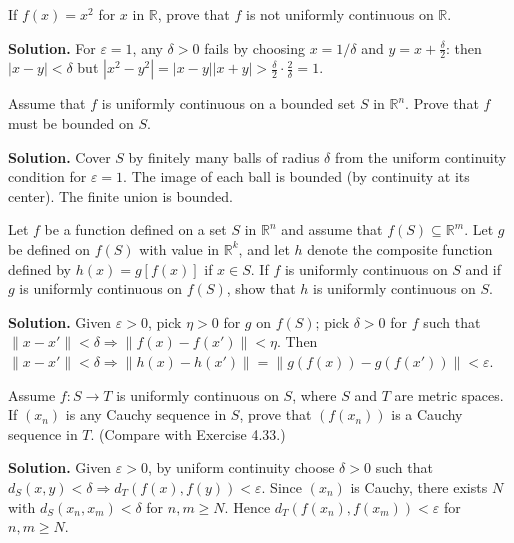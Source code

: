 \begin{problembox}
If $f(x) = x^2$ for $x$ in $\mathbb{R}$, prove that $f$ is not uniformly continuous on $\mathbb{R}$.
\end{problembox}

\noindent\textbf{Solution.}
For $\varepsilon=1$, any $\delta>0$ fails by choosing $x=1/\delta$ and $y=x+\tfrac{\delta}{2}$: then $|x-y|<\delta$ but $|x^2-y^2|=|x-y||x+y|>\tfrac{\delta}{2}\cdot\tfrac{2}{\delta}=1$.
\medskip

\begin{problembox}
Assume that $f$ is uniformly continuous on a bounded set $S$ in $\mathbb{R}^n$. Prove that $f$ must be bounded on $S$.
\end{problembox}

\noindent\textbf{Solution.}
Cover $S$ by finitely many balls of radius $\delta$ from the uniform continuity condition for $\varepsilon=1$. The image of each ball is bounded (by continuity at its center). The finite union is bounded.
\medskip

\begin{problembox}
Let $f$ be a function defined on a set $S$ in $\mathbb{R}^n$ and assume that $f(S) \subseteq \mathbb{R}^m$. Let $g$ be defined on $f(S)$ with value in $\mathbb{R}^k$, and let $h$ denote the composite function defined by $h(x) = g[f(x)]$ if $x \in S$. If $f$ is uniformly continuous on $S$ and if $g$ is uniformly continuous on $f(S)$, show that $h$ is uniformly continuous on $S$.
\end{problembox}

\noindent\textbf{Solution.}
Given $\varepsilon>0$, pick $\eta>0$ for $g$ on $f(S)$; pick $\delta>0$ for $f$ such that $\|x-x'\|<\delta\Rightarrow \|f(x)-f(x')\|<\eta$. Then $\|x-x'\|<\delta\Rightarrow \|h(x)-h(x')\|=\|g(f(x))-g(f(x'))\|<\varepsilon$.
\medskip

\begin{problembox}
Assume $f : S \to T$ is uniformly continuous on $S$, where $S$ and $T$ are metric spaces. If $(x_n)$ is any Cauchy sequence in $S$, prove that $(f(x_n))$ is a Cauchy sequence in $T$. (Compare with Exercise 4.33.)
\end{problembox}

\noindent\textbf{Solution.}
Given $\varepsilon>0$, by uniform continuity choose $\delta>0$ such that $d_S(x,y)<\delta\Rightarrow d_T(f(x),f(y))<\varepsilon$. Since $(x_n)$ is Cauchy, there exists $N$ with $d_S(x_n,x_m)<\delta$ for $n,m\ge N$. Hence $d_T(f(x_n),f(x_m))<\varepsilon$ for $n,m\ge N$.
\medskip

